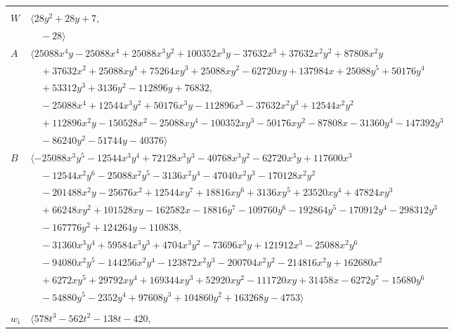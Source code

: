 \documentclass[11pt]{article}
\begin{document}
\begin{longtable}{@{}ll@{}}
\addlinespace[2pt]
\multicolumn{2}{@{}p{0.97\textwidth}@{}}{$i=16$, $D_i=8$, $\rho_{ij}$: $1{:}1, \allowbreak 20{:}2, \allowbreak 26{:}1, \allowbreak 27{:}2, \allowbreak 44{:}1, \allowbreak 64{:}1$}\\
$W$ & $\langle 28y^{2}+28y+7,$\\
 & $\quad -28\rangle$\\
$A$ & $\langle 25088x^{4}y-25088x^{4}+25088x^{3}y^{2}+100352x^{3}y-37632x^{3}+37632x^{2}y^{2}+87808x^{2}y$\\
 & $\quad +37632x^{2}+25088xy^{4}+75264xy^{3}+25088xy^{2}-62720xy+137984x+25088y^{5}+50176y^{4}$\\
 & $\quad +53312y^{3}+3136y^{2}-112896y+76832,$\\
 & $\quad -25088x^{4}+12544x^{3}y^{2}+50176x^{3}y-112896x^{3}-37632x^{2}y^{3}+12544x^{2}y^{2}$\\
 & $\quad +112896x^{2}y-150528x^{2}-25088xy^{4}-100352xy^{3}-50176xy^{2}-87808x-31360y^{4}-147392y^{3}$\\
 & $\quad -86240y^{2}-51744y-40376\rangle$\\
$B$ & $\langle -25088x^{3}y^{5}-12544x^{3}y^{4}+72128x^{3}y^{3}-40768x^{3}y^{2}-62720x^{3}y+117600x^{3}$\\
 & $\quad -12544x^{2}y^{6}-25088x^{2}y^{5}-3136x^{2}y^{4}-47040x^{2}y^{3}-170128x^{2}y^{2}$\\
 & $\quad -201488x^{2}y-25676x^{2}+12544xy^{7}+18816xy^{6}+3136xy^{5}+23520xy^{4}+47824xy^{3}$\\
 & $\quad +66248xy^{2}+101528xy-162582x-18816y^{7}-109760y^{6}-192864y^{5}-170912y^{4}-298312y^{3}$\\
 & $\quad -167776y^{2}+124264y-110838,$\\
 & $\quad -31360x^{3}y^{4}+59584x^{3}y^{3}+4704x^{3}y^{2}-73696x^{3}y+121912x^{3}-25088x^{2}y^{6}$\\
 & $\quad -94080x^{2}y^{5}-144256x^{2}y^{4}-123872x^{2}y^{3}-200704x^{2}y^{2}-214816x^{2}y+162680x^{2}$\\
 & $\quad +6272xy^{5}+29792xy^{4}+169344xy^{3}+52920xy^{2}-111720xy+31458x-6272y^{7}-15680y^{6}$\\
 & $\quad -54880y^{5}-2352y^{4}+97608y^{3}+104860y^{2}+163268y-4753\rangle$\\
\addlinespace[2pt]
\multicolumn{2}{@{}p{0.97\textwidth}@{}}{$i=17$, $D_i=8$, $\rho_{ij}$: $1{:}1, \allowbreak 2{:}1, \allowbreak 5{:}2, \allowbreak 30{:}2, \allowbreak 50{:}2, \allowbreak 54{:}2, \allowbreak 55{:}2$}\\
$w_i$ & $\langle 578t^{3}-562t^{2}-138t-420,$\\

\end{longtable}
\end{document}
